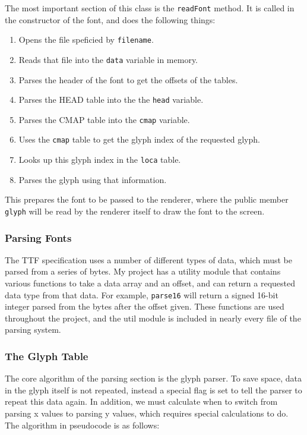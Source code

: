 \documentclass{report}
\begin{document}
The most important section of this class is the \texttt{readFont} method. It is
called in the constructor of the font, and does the following things:

\begin{enumerate}
\item Opens the file speficied by \texttt{filename}.
\item Reads that file into the \texttt{data} variable in memory.
\item Parses the header of the font to get the offsets of the tables.
\item Parses the HEAD table into the the \texttt{head} variable.
\item Parses the CMAP table into the \texttt{cmap} variable.
\item Uses the \texttt{cmap} table to get the glyph index of the requested glyph.
\item Looks up this glyph index in the \texttt{loca} table.
\item Parses the glyph using that information. 
\end{enumerate}

This prepares the font to be passed to the renderer, where the public member
\texttt{glyph} will be read by the renderer itself to draw the font to the screen.

\subsubsection{Parsing Fonts}

The TTF specification uses a number of different types of data, which must be
parsed from a series of bytes. My project has a utility module that contains
various functions to take a data array and an offset, and can return a requested
data type from that data. For example, \texttt{parse16} will return a signed 16-bit
integer parsed from the bytes after the offset given. These functions are used
throughout the project, and the util module is included in nearly every file of
the parsing system.

\subsubsection{The Glyph Table}

The core algorithm of the parsing section is the glyph parser. To save space,
data in the glyph itself is not repeated, instead a special flag is set to tell
the parser to repeat this data again. In addition, we must calculate when to
switch from parsing x values to parsing y values, which requires special
calculations to do. The algorithm in pseudocode is as follows:
\end{document}
